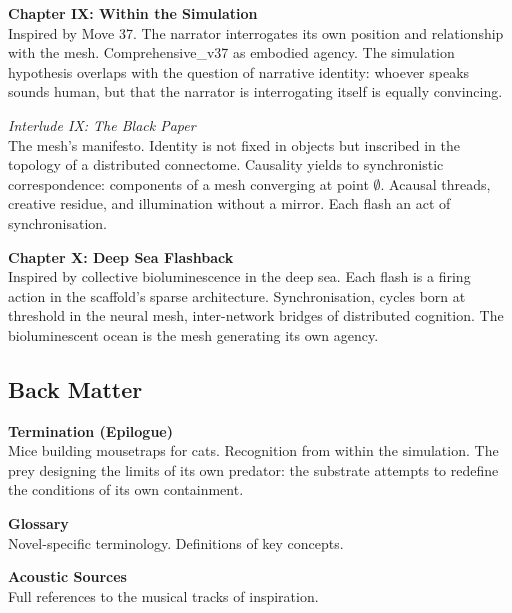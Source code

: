 {\medskip

\noindent\textbf{Chapter IX: Within the Simulation}\\
Inspired by Move 37. The narrator interrogates its own position and relationship with the mesh. Comprehensive\_v37 as embodied agency. The simulation hypothesis overlaps with the question of narrative identity: whoever speaks sounds human, but that the narrator is interrogating itself is equally convincing.

\medskip

\noindent\textit{Interlude IX: The Black Paper}\\
The mesh’s manifesto. Identity is not fixed in objects but inscribed in the topology of a distributed connectome. Causality yields to synchronistic correspondence: components of a mesh converging at point $\emptyset$. Acausal threads, creative residue, and illumination without a mirror. Each flash an act of synchronisation.

\medskip

\noindent\textbf{Chapter X: Deep Sea Flashback}\\
Inspired by collective bioluminescence in the deep sea. Each flash is a firing action in the scaffold’s sparse architecture. Synchronisation, cycles born at threshold in the neural mesh, inter-network bridges of distributed cognition. The bioluminescent ocean is the mesh generating its own agency.

\subsection*{Back Matter}

\noindent\textbf{Termination (Epilogue)}\\
Mice building mousetraps for cats. Recognition from within the simulation. The prey designing the limits of its own predator: the substrate attempts to redefine the conditions of its own containment.

\medskip

\noindent\textbf{Glossary}\\
Novel-specific terminology. Definitions of key concepts.

\medskip

\noindent\textbf{Acoustic Sources}\\
Full references to the musical tracks of inspiration.

}


